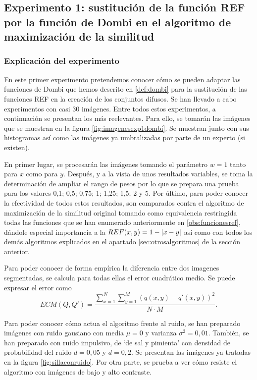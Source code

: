 \subsection{Experimento 1: sustitución de la función REF por la función de Dombi en el algoritmo de maximización de la similitud}
\subsubsection{Explicación del experimento}
En este primer experimento pretendemos conocer cómo se pueden adaptar las funciones de Dombi que hemos descrito en \ref{def:dombi} para la sustitución de las funciones REF en la creación de los conjuntos difusos. Se han llevado a cabo experimentos con casi 30 imágenes. Entre todos estos experimentos, a continuación se presentan los más reelevantes. Para ello, se tomarán las imágenes que se muestran en la figura \ref{fig:imagenesexp1dombi}. Se muestran junto con sus histogramas así como las imágenes ya umbralizadas por parte de un experto (si existen). 

En primer lugar, se procesarán las imágenes tomando el parámetro $w=1$ tanto para $x$ como para $y$. Después, y a la vista de unos resultados variables, se toma la determinación de ampliar el rango de pesos por lo que se prepara una prueba para los valores 0,1; 0,5; 0,75; 1; 1,25; 1,5; 2 y 5. Por último, para poder conocer la efectividad de todos estos resultados, son comparados contra el algoritmo de maximización de la similitud original tomando como equivalencia restringida todas las funciones que se han enumerado anteriormente en \ref{obs:funcionesref}, dándole especial importancia a la \mbox{$REF(x,y)=1-\left\vert x-y\right\vert$} así como con todos los demás algoritmos explicados en el apartado \ref{sec:otrosalgoritmos} de la sección anterior. 

Para poder conocer de forma empírica la diferencia entre dos imagenes segmentadas, se calcula para todas ellas el error cuadrático medio. Se puede expresar el error como
$$ECM(Q, Q') = \frac{\sum_{x=1}^N\sum_{y=1}^M \left(q(x,y)-q'(x,y)\right)^2}{N\cdot M}.$$

Para poder conocer cómo actua el algoritmo frente al ruido, se han preparado imágenes con ruido gausiano con media $\mu=0$ y varianza $\sigma^2 = 0,01$. También, se han preparado con ruido impulsivo, de `de sal y pimienta' con densidad de probabilidad del ruido $d=0,05$ y $d=0,2$. Se presentan las imágenes ya tratadas en la figura \ref{fig:sillaconruido}. Por otra parte, se prueba a ver cómo resiste el algoritmo con imágenes de bajo y alto contraste. 


